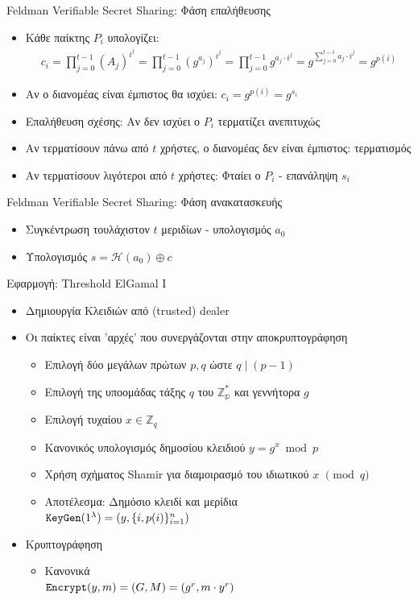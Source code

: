 \documentclass[handout]{beamer}
\begin{document}
\begin{frame}{Feldman Verifiable Secret Sharing: {Φάση επαλήθευσης}}
	\begin{itemize}
		\item Κάθε παίκτης $P_i$ υπολογίζει:
		\begin{align*}
			c_i = \prod_{j=0}^{t-1}(A_j)^{i^j} = \prod_{j=0}^{t-1} (g^{a_j})^{i^j} = \prod_{j=0}^{t-1} g^{a_j \cdot i^j} = g^{\sum_{j=0}^{t-1} a_j \cdot i^j} = g^{p(i)}
		\end{align*} \pause 
		\item Αν ο διανομέας είναι έμπιστος θα ισχύει: $c_i = g^{p(i)} = g^{s_i}$ \pause 
		\item Επαλήθευση σχέσης: Αν δεν ισχύει ο $P_i$ τερματίζει ανεπιτυχώς \pause 
		\item Αν τερματίσουν πάνω από $t$ χρήστες, ο διανομέας δεν είναι έμπιστος: τερματισμός \pause 
		\item Αν τερματίσουν λιγότεροι από $t$ χρήστες: Φταίει ο $P_i$ -  επανάληψη $s_i$	
	\end{itemize}		
\end{frame}

\begin{frame}{Feldman Verifiable Secret Sharing: {Φάση ανακατασκευής}} 
	\begin{itemize}
		\item Συγκέντρωση τουλάχιστον $t$ μεριδίων - υπολογισμός $a_0$ \pause 
		\item Υπολογισμός $s = \mathcal{H}(a_0) \oplus c$
	\end{itemize} 
\end{frame}

\begin{frame}{Εφαρμογή: Threshold ElGamal I}
\begin{itemize}
\item Δημιουργία Κλειδιών από (trusted) dealer
\item Οι παίκτες είναι 'αρχές' που συνεργάζονται στην αποκρυπτογράφηση
\begin{itemize}
\item Επιλογή δύο μεγάλων πρώτων $p,q$ ώστε $q \mid (p-1)$  
\item Επιλογή της υποομάδας τάξης $q$ του $\mathbb{Z_p^*}$ και γεννήτορα $g$
\item Επιλογή τυχαίου $x \in \mathbb{Z}_q$
\item Κανονικός υπολογισμός δημοσίου κλειδιού $y = g^x \bmod{p}$
\pause 
\item Χρήση σχήματος Shamir για διαμοιρασμό του ιδιωτικού $x$ $\pmod{q}$
\item Αποτέλεσμα: Δημόσιο κλειδί και μερίδια\\ $\mathtt{KeyGen}(1^\lambda)=(y, \{ i, p(i) \}_{i=1}^n)$
\end{itemize}
\pause
\item Κρυπτογράφηση
\begin{itemize}
\item Κανονικά \\ $\mathtt{Encrypt}(y,m) = (G,M) = (g^r, m \cdot y^r)$
\end{itemize}
\end{itemize}
\end{frame}
\end{document}
